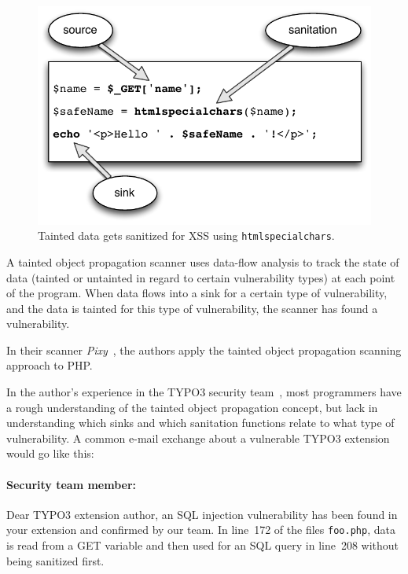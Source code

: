 \begin{figure}[htb]
  \begin{center}
    \includegraphics[scale=0.75]{images/taint-and-clean}
   \caption{Tainted data gets sanitized for XSS using \texttt{htmlspecialchars}.}
   \label{fig:taint-and-clean}
  \end{center}
\end{figure}

A tainted object propagation scanner uses data-flow analysis to track the state of data (tainted or untainted in regard to certain vulnerability types) at each point of the program. When data flows into a sink for a certain type of vulnerability, and the data is tainted for this type of vulnerability, the scanner has found a vulnerability.

In their scanner \emph{Pixy}~\cite{pixy-short, pixy-long, pixy-dissertation}, the authors apply the tainted object propagation scanning approach to PHP.

In the author's experience in the TYPO3 security team~\cite{security-team-members}, most programmers have a rough understanding of the tainted object  propagation concept, but lack in understanding which sinks and which sanitation functions relate to what type of vulnerability. A common e-mail exchange about a vulnerable TYPO3 extension would go like this:

\paragraph*{Security team member:} Dear TYPO3 extension author, an SQL injection vulnerability has been found in your extension and confirmed by our team. In line~172 of the files \texttt{foo.php}, data is read from a GET variable and then used for an SQL query in line~208 without being sanitized first.

